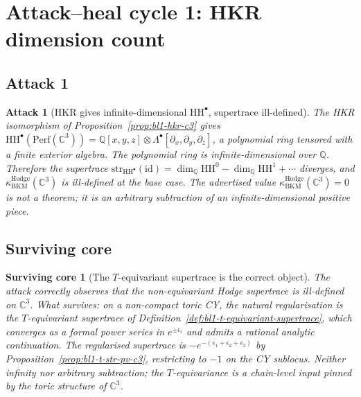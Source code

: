 \documentclass[11pt]{article}
\newtheorem{attack}[theorem]{Attack}
\newtheorem{surviving}[theorem]{Surviving core}
\providecommand{\HH}{\mathrm{HH}}
\providecommand{\Perf}{\mathrm{Perf}}
\providecommand{\id}{\mathrm{id}}
\providecommand{\C}{\mathbb{C}}
\providecommand{\QQ}{\mathbb{Q}}
\providecommand{\kBKM}{\kappa_{\mathrm{BKM}}}
\providecommand{\str}{\mathrm{str}}
\providecommand{\id}{\mathrm{id}}
\begin{document}
\section{Attack--heal cycle 1: HKR dimension count}
\label{sec:bl1-cycle-1}

\subsection{Attack 1}
\label{subsec:bl1-attack-1}

\begin{attack}[HKR gives infinite-dimensional $\HH^\bullet$, supertrace
ill-defined]
\label{attack:bl1-hkr-infinite}
The HKR isomorphism of Proposition~\ref{prop:bl1-hkr-c3} gives
$\HH^\bullet(\Perf(\C^3)) = \QQ[x,y,z] \otimes \Lambda^\bullet[\partial_x,
\partial_y, \partial_z]$, a polynomial ring tensored with a finite
exterior algebra. The polynomial ring is infinite-dimensional over $\QQ$.
Therefore the supertrace
$\str_{\HH^\bullet}(\id) = \dim_\QQ \HH^0 - \dim_\QQ \HH^1 + \cdots$
diverges, and $\kBKM^{\mathrm{Hodge}}(\C^3)$ is ill-defined at the base
case. The advertised value $\kBKM^{\mathrm{Hodge}}(\C^3) = 0$ is not a
theorem; it is an arbitrary subtraction of an infinite-dimensional
positive piece.
\end{attack}

\subsection{Surviving core}
\label{subsec:bl1-survive-1}

\begin{surviving}[The $T$-equivariant supertrace is the correct object]
\label{survive:bl1-1}
The attack correctly observes that the \emph{non-equivariant} Hodge
supertrace is ill-defined on $\C^3$. What survives: on a non-compact
toric CY, the natural regularisation is the $T$-equivariant supertrace
of Definition~\ref{def:bl1-t-equivariant-supertrace}, which converges
as a formal power series in $e^{\pm \epsilon_i}$ and admits a rational
analytic continuation. The regularised supertrace is
$-e^{-(\epsilon_1+\epsilon_2+\epsilon_3)}$ by
Proposition~\ref{prop:bl1-t-str-pv-c3}, restricting to $-1$ on the CY
sublocus. Neither infinity nor arbitrary subtraction; the $T$-equivariance
is a chain-level input pinned by the toric structure of $\C^3$.
\end{surviving}
\end{document}
